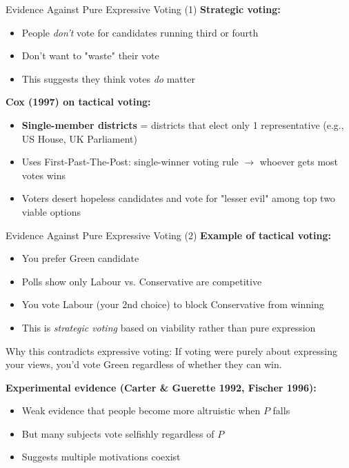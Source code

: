 \documentclass[10pt]{beamer}
\begin{document}
\begin{frame}{Evidence Against Pure Expressive Voting (1)}
\textbf{Strategic voting:}
\begin{itemize}
\item People \emph{don't} vote for candidates running third or fourth
\item Don't want to "waste" their vote
\item This suggests they think votes \emph{do} matter
\end{itemize}



\textbf{Cox (1997) on tactical voting:}
\begin{itemize}
\item \textbf{Single-member districts} = districts that elect only 1 representative (e.g., US House, UK Parliament)
\item Uses First-Past-The-Post: single-winner voting rule $\rightarrow$ whoever gets most votes wins
\item Voters desert hopeless candidates and vote for "lesser evil" among top two viable options
\end{itemize}
\end{frame}

\begin{frame}{Evidence Against Pure Expressive Voting (2)}
\textbf{Example of tactical voting:}
\begin{itemize}
\item You prefer Green candidate
\item Polls show only Labour vs. Conservative are competitive
\item You vote Labour (your 2nd choice) to block Conservative from winning
\item This is \emph{strategic voting} based on viability rather than pure expression
\end{itemize}



\alert{Why this contradicts expressive voting:} If voting were purely about expressing your views, you'd vote Green regardless of whether they can win.



\textbf{Experimental evidence (Carter \& Guerette 1992, Fischer 1996):}
\begin{itemize}
\item Weak evidence that people become more altruistic when $P$ falls
\item But many subjects vote selfishly regardless of $P$
\item Suggests multiple motivations coexist
\end{itemize}
\end{frame}
\end{document}
